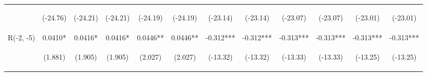 \documentclass[]{article}
\begin{document}
\begin{center}
\begin{tabular}{lccccccccccc}
\vspace{4pt} & \begin{footnotesize}(-24.76)\end{footnotesize} & \begin{footnotesize}(-24.21)\end{footnotesize} & \begin{footnotesize}(-24.21)\end{footnotesize} & \begin{footnotesize}(-24.19)\end{footnotesize} & \begin{footnotesize}(-24.19)\end{footnotesize} & \begin{footnotesize}(-23.14)\end{footnotesize} & \begin{footnotesize}(-23.14)\end{footnotesize} & \begin{footnotesize}(-23.07)\end{footnotesize} & \begin{footnotesize}(-23.07)\end{footnotesize} & \begin{footnotesize}(-23.01)\end{footnotesize} & \begin{footnotesize}(-23.01)\end{footnotesize} \\
R(-2, -5) & 0.0410* & 0.0416* & 0.0416* & 0.0446** & 0.0446** & -0.312*** & -0.312*** & -0.313*** & -0.313*** & -0.313*** & -0.313*** \\
\vspace{4pt} & \begin{footnotesize}(1.881)\end{footnotesize} & \begin{footnotesize}(1.905)\end{footnotesize} & \begin{footnotesize}(1.905)\end{footnotesize} & \begin{footnotesize}(2.027)\end{footnotesize} & \begin{footnotesize}(2.027)\end{footnotesize} & \begin{footnotesize}(-13.32)\end{footnotesize} & \begin{footnotesize}(-13.32)\end{footnotesize} & \begin{footnotesize}(-13.33)\end{footnotesize} & \begin{footnotesize}(-13.33)\end{footnotesize} & \begin{footnotesize}(-13.25)\end{footnotesize} & \begin{footnotesize}(-13.25)\end{footnotesize} \\

\end{tabular}
\end{center}
\end{document}
